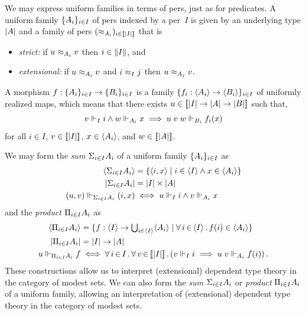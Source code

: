 \iflong
We may express uniform families in terms of pers, just as for
predicates. A uniform family $\{A_i\}_{i \in I}$ of pers indexed
by a per~$I$ is given by an underlying type $|A|$ and a family
of pers $(\approx_{A_i})_{i \in [\![|I|]\!]}$ that is
% 
\begin{itemize}
\item \emph{strict:} if $u \approx_{A_i} v$ then $i \in \|I\|$, and
\item \emph{extensional:} if $u \approx_{A_i} v$ and $i \approx_I j$ then $u
  \approx_{A_j} v$.
\end{itemize}
%
A morphism $f : \{A_i\}_{i \in I} \to \{B_i\}_{i \in I}$ is a
family $\{f_i : \langle A_i \rangle \to \langle B_i \rangle\}_{i \in I}$ of
uniformly realized maps, which means that there exists $u \in
[\![|I| \to |A| \to |B|]\!]$ such that,
%
\begin{equation*}
  v \Vdash_I i \land w \Vdash_{A_i} x \implies u\; v \; w \Vdash_{B_i} f_i(x)
\end{equation*}
%
for all $i \in I$, $v \in [\![|I|]\!]$, $x \in \langle A_i \rangle$,
and $w \in [\![|A|]\!]$.
\fi %

\iflong
We may form the \emph{sum} ${\Sigma_{i \in I} A_i}$ of a uniform family
$\{A_i\}_{i \in I}$ as
%
\begin{align*}
  \langle {\Sigma_{i \in I} A_i} \rangle &=
  \{\langle i,x \rangle \mid i \in \langle I \rangle \land x \in \langle A_i \rangle\}
  \\
  |{\Sigma_{i \in I} A_i}| &=
  |I| \times |A|
  \\
  (u,v) \Vdash_{{\Sigma_{i \in I} A_i}} (i,x)
  &\iff
  u \Vdash_I i \land v \Vdash_{A_i} x
\end{align*}
%
and the \emph{product} ${\Pi_{i \in I} A_i}$ as
%
\begin{align*}
  \langle {\Pi_{i \in I} A_i} \rangle &=
  \{f : \langle I \rangle \to {\textstyle \bigcup_{i \in \langle I \rangle} \langle A_i \rangle} \mid
    \forall\, i \,{\in}\, \langle I \rangle\,.\,f(i) \in \langle A_i \rangle\}
  \\
  |{\Pi_{i \in I} A_i}| &=
  |I| \to |A|
  \\
  u \Vdash_{{\Pi_{i \in I} A_i}} f
  &\iff
  \forall\, i \,{\in}\, I\,.\,\forall\, v \,{\in}\, [\![|I|]\!]\,.\left(
      v \Vdash_I i \implies
      u \; v \Vdash_{A_i} f(i)
    \right).
\end{align*}
%
These constructions allow us to interpret (extensional) dependent type
theory in the category of modest sets.
\else %
We can also form the \emph{sum} ${\Sigma_{i \in I} A_i}$ or
\emph{product} ${\Pi_{i \in I} A_i}$ of
a uniform family, allowing an interpretation of (extensional) dependent type
theory in the category of modest sets.
\fi %

